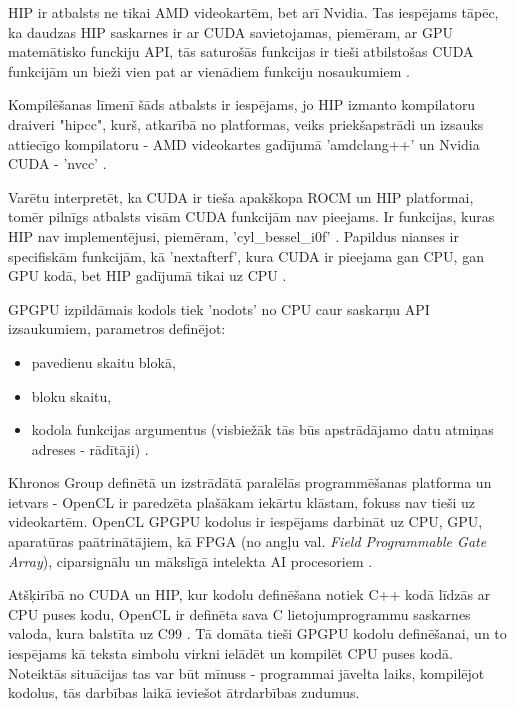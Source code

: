 HIP ir atbalsts ne tikai AMD videokartēm, bet arī Nvidia. Tas iespējams tāpēc,
ka  daudzas HIP saskarnes ir ar CUDA savietojamas, piemēram, ar GPU matemātisko
funckiju API, tās saturošās funkcijas ir tieši atbilstošas CUDA funkcijām un
bieži vien pat ar vienādiem funkciju nosaukumiem 
\cite{HIP_math_API,CUDA_math_API}.

Kompilēšanas līmenī šāds atbalsts ir iespējams, jo HIP izmanto kompilatoru
draiveri "hipcc", kurš, atkarībā no platformas, veiks priekšapstrādi un izsauks
attiecīgo kompilatoru - AMD videokartes gadījumā 'amdclang++' un Nvidia CUDA -
'nvcc' \cite{HIP_compilers}.

Varētu interpretēt, ka CUDA ir tieša apakškopa ROCM un HIP platformai, tomēr pilnīgs atbalsts
visām CUDA funkcijām nav pieejams. Ir funkcijas, kuras HIP nav implementējusi, piemēram,
'cyl\_bessel\_i0f' \cite{HIP_math_API}. Papildus nianses ir specifiskām funkcijām, kā 'nextafterf', kura CUDA
ir pieejama gan CPU, gan GPU kodā, bet HIP gadījumā tikai uz CPU \cite{HIP_math_API}.

GPGPU izpildāmais kodols tiek 'nodots' no CPU caur saskarņu API izsaukumiem,
parametros definējot:
\begin{itemize}
    \item pavedienu skaitu blokā,
    \item bloku skaitu,
    \item kodola funkcijas argumentus (visbiežāk tās būs apstrādājamo datu
        atmiņas adreses - rādītāji) \cite{GPGPU_gramata}.
\end{itemize}


Khronos Group definētā un izstrādātā paralēlās programmēšanas platforma un
ietvars - OpenCL ir paredzēta plašākam iekārtu klāstam, fokuss nav tieši uz
videokartēm. OpenCL GPGPU kodolus ir iespējams darbināt uz CPU, GPU,
aparatūras paātrinātājiem, kā FPGA (no angļu val. \textit{Field Programmable Gate
Array}), ciparsignālu un mākslīgā intelekta AI procesoriem \cite{opencl-spec}.

Atšķirībā no CUDA un HIP, kur kodolu definēšana notiek C++ kodā līdzās ar CPU
puses kodu, OpenCL ir definēta sava C lietojumprogrammu saskarnes valoda, kura
balstīta uz C99 \cite{opencl_c_lang_spec}. Tā domāta tieši GPGPU kodolu
definēšanai, un to iespējams kā teksta simbolu virkni ielādēt un kompilēt CPU
puses kodā. Noteiktās situācijas tas var būt mīnuss - programmai jāvelta laiks,
kompilējot kodolus, tās darbības laikā ieviešot ātrdarbības zudumus.


